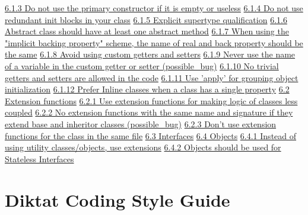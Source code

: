 \hspace{1.0cm}\hyperref[sec:6.1.3]{ 6.1.3 Do not use the primary constructor if it is empty or useless}
\hspace{1.0cm}\hyperref[sec:6.1.4]{ 6.1.4 Do not use redundant init blocks in your class}
\hspace{1.0cm}\hyperref[sec:6.1.5]{ 6.1.5 Explicit supertype qualification}
\hspace{1.0cm}\hyperref[sec:6.1.6]{ 6.1.6 Abstract class should have at least one abstract method}
\hspace{1.0cm}\hyperref[sec:6.1.7]{ 6.1.7 When using the "implicit backing property" scheme, the name of real and back property should be the same}
\hspace{1.0cm}\hyperref[sec:6.1.8]{ 6.1.8 Avoid using custom getters and setters}
\hspace{1.0cm}\hyperref[sec:6.1.9]{ 6.1.9 Never use the name of a variable in the custom getter or setter (possible_bug)}
\hspace{1.0cm}\hyperref[sec:6.1.10]{ 6.1.10 No trivial getters and setters are allowed in the code}
\hspace{1.0cm}\hyperref[sec:6.1.11]{ 6.1.11 Use 'apply' for grouping object initialization}
\hspace{1.0cm}\hyperref[sec:6.1.12]{ 6.1.12 Prefer Inline classes when a class has a single property}
\hspace{0.5cm}\hyperref[sec:6.2]{ 6.2 Extension functions}
\hspace{1.0cm}\hyperref[sec:6.2.1]{ 6.2.1 Use extension functions for making logic of classes less coupled}
\hspace{1.0cm}\hyperref[sec:6.2.2]{ 6.2.2 No extension functions with the same name and signature if they extend base and inheritor classes (possible_bug)}
\hspace{1.0cm}\hyperref[sec:6.2.3]{ 6.2.3 Don't use extension functions for the class in the same file}
\hspace{0.5cm}\hyperref[sec:6.3]{ 6.3 Interfaces}
\hspace{0.5cm}\hyperref[sec:6.4]{ 6.4 Objects}
\hspace{1.0cm}\hyperref[sec:6.4.1]{ 6.4.1 Instead of using utility classes/objects, use extensions}
\hspace{1.0cm}\hyperref[sec:6.4.2]{ 6.4.2 Objects should be used for Stateless Interfaces}
\section*{Diktat Coding Style Guide}
